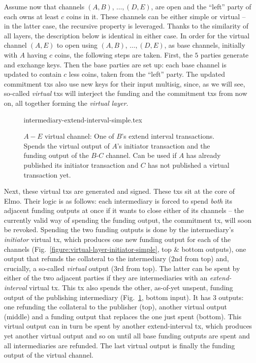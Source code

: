   Assume now that channels $(A, B)$, $\dots,(D, E)$, are open and the ``left''
  party of each owns at least $c$ coins in it. These channels can be either
  simple or virtual -- in the latter case, the recursive property is leveraged.
  Thanks to the similarity of all layers, the description below is identical in
  either case. In order for the virtual channel $(A, E)$ to open using $(A, B)$,
  $\dots,(D, E)$, as base channels, initially with $A$ having $c$ coins, the
  following
  steps are taken. First, the $5$ parties generate and exchange keys. Then the
  base parties are set up: each base channel is updated to contain $c$ less
  coins, taken from the ``left'' party. The updated commitment txs also use new
  keys for their input multisig, since, as we will see, so-called \emph{virtual}
  txs will interject the funding and the commitment txs from now on, all
  together forming the \emph{virtual layer}.

  \addtolength{\intextsep}{-15pt}
  \begin{figure}[!htbp]
    {intermediary-extend-interval-simple.tex}
    \caption{$A-E$ virtual channel: One of $B$'s extend interval
    transactions. Spends the virtual output of $A$'s
    initiator transaction and the funding output of the $B$-$C$ channel. Can be
    used if $A$ has already published its initiator transaction and $C$ has not
    published a virtual transaction yet.}
    \label{figure:virtual-layer-extend-interval-simple}
  \end{figure}
  \addtolength{\intextsep}{15pt}

  Next, these virtual txs are generated and signed. These txs sit at the core of
  Elmo. Their logic is as follows: each intermediary is forced to spend
  \emph{both} its
  adjacent funding outputs at once if it wants to close either of its channels
  -- the currently valid way of spending the funding output, the commitment tx,
  will soon be revoked. Spending the two funding outputs is done by the
  intermediary's \emph{initiator} virtual tx, which produces one new funding
  output for each of the channels
  (Fig.~\ref{figure:virtual-layer-initiator-simple}, top \& bottom outputs), one
  output that refunds the collateral to the intermediary ($2$nd from top) and,
  crucially, a so-called \emph{virtual} output ($3$rd from top). The latter
  can be spent by either of the two adjacent parties if they are
  intermediaries with an \emph{extend-interval} virtual tx. This tx also
  spends the other, as-of-yet unspent, funding output of the publishing
  intermediary (Fig.~\ref{figure:virtual-layer-extend-interval-simple}, bottom
  input). It has $3$ outputs: one refunding the collateral to the publisher
  (top), another virtual output (middle) and a funding output that replaces the
  one just spent (bottom). This virtual output can in turn be spent by another
  extend-interval tx, which produces yet another virtual output and so on until
  all base funding outputs are spent and all intermediaries are refunded. The
  last virtual output is finally the funding output of the virtual channel.

